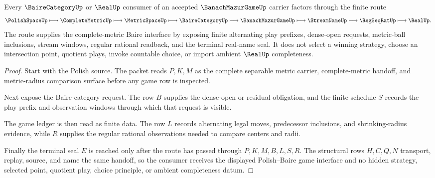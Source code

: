 \begin{theorem}
\label{thm:banach-mazur-game-polish-baire-handoff}
Every $\BaireCategoryUp$ or $\RealUp$ consumer of an accepted $\BanachMazurGameUp$ carrier factors through the finite route
$$
\PolishSpaceUp
\longmapsto
\CompleteMetricUp
\longmapsto
\MetricSpaceUp
\longmapsto
\BaireCategoryUp
\longmapsto
\BanachMazurGameUp
\longmapsto
\StreamNameUp
\longmapsto
\RegSeqRatUp
\longmapsto
\RealUp .
$$
The route supplies the complete-metric Baire interface by exposing finite alternating play prefixes, dense-open requests, metric-ball inclusions, stream windows, regular rational readback, and the terminal real-name seal. It does not select a winning strategy, choose an intersection point, quotient plays, invoke countable choice, or import ambient $\RealUp$ completeness.
\end{theorem}
\begin{proof}
Start with the Polish source. The packet reads $P,K,M$ as the complete separable metric carrier, complete-metric handoff, and metric-radius comparison surface before any game row is inspected.

Next expose the Baire-category request. The row $B$ supplies the dense-open or residual obligation, and the finite schedule $S$ records the play prefix and observation windows through which that request is visible.

The game ledger is then read as finite data. The row $L$ records alternating legal moves, predecessor inclusions, and shrinking-radius evidence, while $R$ supplies the regular rational observations needed to compare centers and radii.

Finally the terminal seal $E$ is reached only after the route has passed through $P,K,M,B,L,S,R$. The structural rows $H,C,Q,N$ transport, replay, source, and name the same handoff, so the consumer receives the displayed Polish--Baire game interface and no hidden strategy, selected point, quotient play, choice principle, or ambient completeness datum.
\end{proof}


